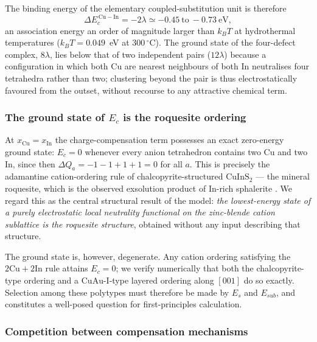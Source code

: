 \documentclass[11pt,a4paper]{article}
\newcommand{\dQ}{\Delta Q}
\begin{document}
\noindent
The binding energy of the elementary coupled-substitution unit is therefore
\begin{equation}
\Delta E_c^{\,\mathrm{Cu-In}} = -2\lambda \simeq -0.45 \ \text{to} \ -0.73\ \mathrm{eV},
\label{eq:binding}
\end{equation}
an association energy an order of magnitude larger than $k_B T$ at hydrothermal
temperatures ($k_BT = 0.049$~eV at $300\,^\circ$C). The ground state of the
four-defect complex, $8\lambda$, lies below that of two independent pairs
($12\lambda$) because a configuration in which both Cu are nearest neighbours of
both In neutralises four tetrahedra rather than two; clustering beyond the pair
is thus electrostatically favoured from the outset, without recourse to any
attractive chemical term.

\subsubsection{The ground state of \texorpdfstring{$E_c$}{Ec} is the roquesite ordering}
\label{sec:groundstate}

At $x_{\mathrm{Cu}} = x_{\mathrm{In}}$ the charge-compensation term possesses an
exact zero-energy ground state: $E_c = 0$ whenever every anion tetrahedron
contains two Cu and two In, since then $\dQ_a = -1-1+1+1 = 0$ for all $a$. This
is precisely the adamantine cation-ordering rule of chalcopyrite-structured
$\mathrm{CuInS_2}$ --- the mineral roquesite, which is the observed exsolution
product of In-rich sphalerite \citep{moura2007}. We regard this as the central structural result
of the model: \emph{the lowest-energy state of a purely electrostatic local
neutrality functional on the zinc-blende cation sublattice is the roquesite
structure}, obtained without any input describing that structure.

The ground state is, however, degenerate. Any cation ordering satisfying the
$2\mathrm{Cu} + 2\mathrm{In}$ rule attains $E_c = 0$; we verify numerically that
both the chalcopyrite-type ordering and a $\mathrm{CuAu\text{-}I}$-type layered
ordering along $[001]$ do so exactly. Selection among these polytypes must
therefore be made by $E_s$ and $E_{sub}$, and constitutes a well-posed question
for first-principles calculation.

\subsubsection{Competition between compensation mechanisms}
\label{sec:competition}
\end{document}
